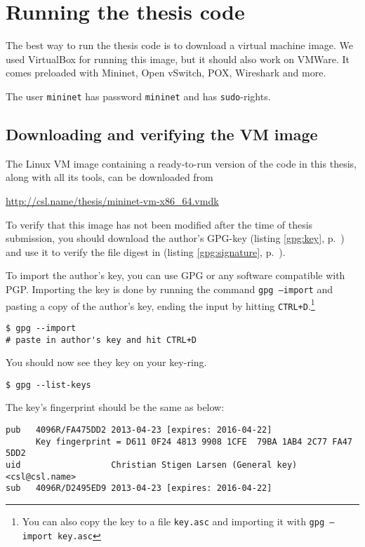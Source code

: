 \chapter{Running the thesis code}
\label{chapter:install.vm}

The best way to run the thesis code is to download a virtual machine image.
We used VirtualBox for running this image, but it should
also work on VMWare.  It comes preloaded with
Mininet, Open vSwitch, POX,
  Wireshark and more.

The user \texttt{mininet} has password \texttt{mininet} and has
\texttt{sudo}-rights.

\section{Downloading and verifying the VM image}

The Linux VM image containing a ready-to-run version of the
code in this thesis, along with all its tools, can be downloaded from

\begin{center}
  \url{http://csl.name/thesis/mininet-vm-x86_64.vmdk}
  \label{gpg:url}
\end{center}

To verify that this image has not been modified after the time of thesis
submission, you should download the author's GPG-key (listing
\ref{gpg:key}, p.~\pageref{gpg:key}) and use it to verify the file digest
in (listing \ref{gpg:signature}, p.~\pageref{gpg:signature}).

To import the author's key, you can use \ac{GPG} or any software compatible
with PGP.  Importing the key is done by running the command
\texttt{gpg --import} and pasting a copy of the author's key, ending the
input by hitting \texttt{CTRL+D}.\footnote{You can also copy the key to a
  file \texttt{key.asc} and importing it with \texttt{gpg --import key.asc}}
%
\begin{Verbatim}
$ gpg --import
# paste in author's key and hit CTRL+D
\end{Verbatim}
%
You should now see they key on your key-ring.
%
\begin{Verbatim}
$ gpg --list-keys
\end{Verbatim}
%
The key's fingerprint should be the same as below:
%
\begin{lstlisting}[label={gpg:key.fingerprint}]
pub   4096R/FA475DD2 2013-04-23 [expires: 2016-04-22]
      Key fingerprint = D611 0F24 4813 9908 1CFE  79BA 1AB4 2C77 FA47 5DD2
uid                  Christian Stigen Larsen (General key) <csl@csl.name>
sub   4096R/D2495ED9 2013-04-23 [expires: 2016-04-22]
\end{lstlisting}


